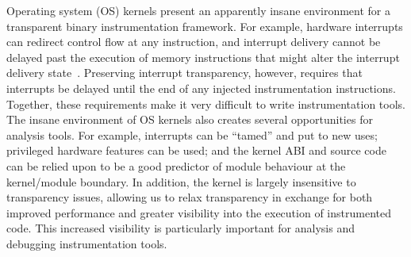 \documentclass[preprint]{sigplanconf}
\begin{document}

Operating system (OS) kernels present an apparently insane environment for a transparent binary instrumentation framework.  For example, hardware interrupts can redirect control flow at any instruction, and interrupt delivery cannot be delayed past the execution of memory instructions that might alter the interrupt delivery state~\cite{DRK}. Preserving interrupt transparency, however, requires that interrupts be delayed until the end of any injected instrumentation instructions.  Together, these requirements make it very difficult to write instrumentation tools.  The insane environment of OS kernels also creates several opportunities for analysis tools. For example, interrupts can be ``tamed'' and put to new uses; privileged hardware features can be used; and the kernel ABI and source code can be relied upon to be a good predictor of module behaviour at the kernel/module boundary. In addition, the kernel is largely insensitive to transparency issues, allowing us to relax transparency in exchange for both improved performance and greater visibility into the execution of instrumented code.  This increased visibility is particularly important for analysis and debugging instrumentation tools.
\end{document}
